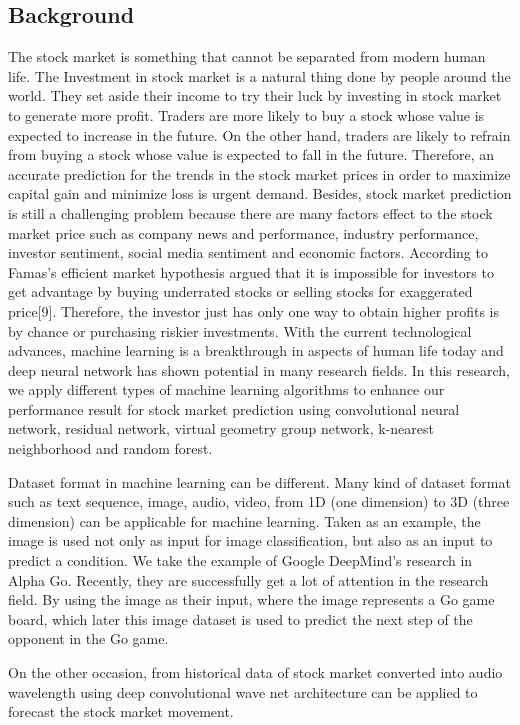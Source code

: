 \documentclass[10pt,twocolumn]{article}
\begin{document}
\subsection{Background}
The stock market is something that cannot be separated from modern human life. The Investment in stock market is a natural thing done by people around the world. They set aside their income to try their luck by investing in stock market to generate more profit. Traders are more likely to buy a stock whose value is expected to increase in the future. On the other hand, traders are likely to refrain from buying a stock whose value is expected to fall in the future. Therefore, an accurate prediction for the trends in the stock market prices in order to maximize capital gain and minimize loss is urgent demand. Besides, stock market prediction is still a challenging problem because there are many factors effect to the stock market price such as company news and performance, industry performance, investor sentiment, social media sentiment and economic factors. According to Famas’s efficient market hypothesis argued that it is impossible for investors to get advantage by buying underrated stocks or selling stocks for exaggerated price[9]. Therefore, the investor just has only one way to obtain higher profits is by chance or purchasing riskier investments. With the current technological advances, machine learning is a breakthrough in aspects of human life today and deep neural network has shown potential in many research fields. In this research, we apply different types of machine learning algorithms to enhance our performance result for stock market prediction using convolutional neural network, residual network, virtual geometry group network, k-nearest neighborhood and random forest.
\par
Dataset format in machine learning can be different. Many kind of dataset format such as text sequence, image, audio, video, from 1D (one dimension) to 3D (three dimension) can be applicable for machine learning. Taken as an example, the image is used not only as input for image classification, but also as an input to predict a condition. We take the example of Google DeepMind's research in Alpha Go\cite{he2016deep}. Recently, they are successfully get a lot of attention in the research field. By using the image as their input, where the image represents a Go game board, which later this image dataset is used to predict the next step of the opponent in the Go game.
\par
On the other occasion, from historical data of stock market converted into audio wavelength using deep convolutional wave net architecture can be applied to forecast the stock market movement\cite{borovykhdilated}.
\end{document}
